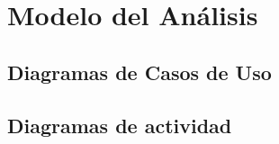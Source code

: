 \section{Modelo del Análisis}


\subsection{Diagramas de Casos de Uso}



\subsection{Diagramas de actividad}





